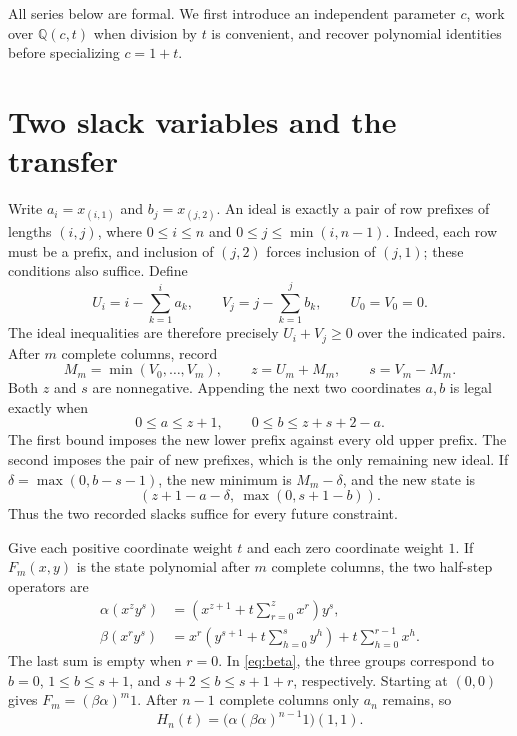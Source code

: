 \documentclass[11pt]{article}
\newcommand{\Q}{\mathbb Q}
\begin{document}
All series below are formal. We first introduce an independent parameter
$c$, work over $\Q(c,t)$ when division by $t$ is convenient, and recover
polynomial identities before specializing $c=1+t$.

\section{Two slack variables and the transfer}
Write $a_i=x_{(i,1)}$ and $b_j=x_{(j,2)}$. An ideal is exactly a pair of
row prefixes of lengths $(i,j)$, where
$0\leq i\leq n$ and $0\leq j\leq\min(i,n-1)$.
Indeed, each row must be a prefix, and inclusion of $(j,2)$ forces
inclusion of $(j,1)$; these conditions also suffice. Define
\[
 U_i=i-\sum_{k=1}^ia_k,\qquad V_j=j-\sum_{k=1}^jb_k,
 \qquad U_0=V_0=0.
\]
The ideal inequalities are therefore precisely $U_i+V_j\geq0$ over the
indicated pairs. After $m$ complete columns, record
\[
 M_m=\min(V_0,\ldots,V_m),\qquad z=U_m+M_m,\qquad s=V_m-M_m.
\]
Both $z$ and $s$ are nonnegative. Appending the next two coordinates
$a,b$ is legal exactly when
\begin{equation}\label{eq:bounds}
 0\leq a\leq z+1,\qquad 0\leq b\leq z+s+2-a.
\end{equation}
The first bound imposes the new lower prefix against every old upper
prefix. The second imposes the pair of new prefixes, which is the only
remaining new ideal. If $\delta=\max(0,b-s-1)$, the new minimum is
$M_m-\delta$, and the new state is
\begin{equation}\label{eq:update}
 (z+1-a-\delta,\ \max(0,s+1-b)).
\end{equation}
Thus the two recorded slacks suffice for every future constraint.

Give each positive coordinate weight $t$ and each zero coordinate weight
$1$. If $F_m(x,y)$ is the state polynomial after $m$ complete columns,
the two half-step operators are
\begin{align}
 \alpha(x^zy^s)&=\left(x^{z+1}+t\sum_{r=0}^z x^r\right)y^s,
 \label{eq:alpha}\\
 \beta(x^ry^s)&=x^r\left(y^{s+1}+t\sum_{h=0}^s y^h\right)
                    +t\sum_{h=0}^{r-1}x^h.\label{eq:beta}
\end{align}
The last sum is empty when $r=0$. In \eqref{eq:beta}, the three groups
correspond to $b=0$, $1\leq b\leq s+1$, and
$s+2\leq b\leq s+1+r$, respectively. Starting at $(0,0)$ gives
$F_m=(\beta\alpha)^m1$. After $n-1$ complete columns only $a_n$ remains,
so
\begin{equation}\label{eq:terminal}
 H_n(t)=\bigl(\alpha(\beta\alpha)^{n-1}1\bigr)(1,1).
\end{equation}
\end{document}

